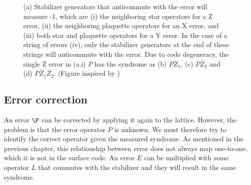 \begin{figure}
  \hspace{1cm}
  \caption{(a) Stabilizer generators that anticommute with the error will measure -1, which are (i) the neighboring star operators for a Z error, (ii) the neighboring plaquette operators for an X error, and (iii) both star and plaquette operators for a Y error. In the case of a string of errors (iv), only the stabilizer generators at the end of these strings will anticommute with the error. Due to code degeneracy, the single Z error in (a.i) $P$ has the syndrome as (b) $P\bar{Z}_1$, (c) $P\bar{Z}_2$ and (d) $P\bar{Z}_1\bar{Z}_2$. (Figure inspired by \cite{browne})}\label{sf:fig_degenerate}
\end{figure}

\subsection{Error correction}
An error $\P$ can be corrected by applying it again to the lattice. However, the problem is that the error operator $P$ is unknown. We must therefore try to identify the correct operator given the measured syndrome. As mentioned in the previous chapter, this relationship between error does not always map one-to-one, which it is not in the surface code. An error $E$ can be multiplied with some operator $L$ that commutes with the stabilizer and they will result in the same syndrome.

